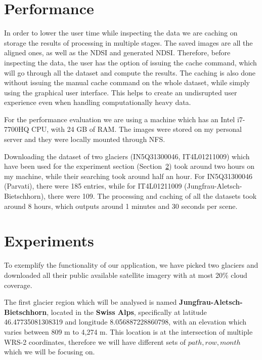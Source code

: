 \documentclass[12pt, a4paper]{report}
\begin{document}
	
	\section{Performance}
	\label{seq:performance}
	
	\par In order to lower the user time while inspecting the data we are caching on storage the results of processing in multiple stages. The saved images are all the aligned ones, as well as the NDSI and generated NDSI. Therefore, before inspecting the data, the user has the option of issuing the cache command, which will go through all the dataset and compute the results. The caching is also done without issuing the manual cache command on the whole dataset, while simply using the graphical user interface. This helps to create an undisrupted user experience even when handling computationally heavy data.
	
	For the performance evaluation we are using a machine which has an Intel i7-7700HQ CPU, with 24 GB of RAM. The images were stored on my personal server and they were locally mounted through NFS.
	
	Downloading the dataset of two glaciers (IN5Q31300046, IT4L01211009) which have been used for the experiment section (Section~\ref{seq:experiments}) took around two hours on my machine, while their searching took around half an hour. For IN5Q31300046 (Parvati), there were 185 entries, while for IT4L01211009 (Jungfrau-Aletsch-Bietschhorn), there were 109. The processing and caching of all the datasets took around 8 hours, which outputs around 1 minutes and 30 seconds per scene.
	
	\section{Experiments}
	\label{seq:experiments}
	
	\par To exemplify the functionality of our application, we have picked two glaciers and downloaded all their public available satellite imagery with at most 20\% cloud coverage. 
	
	\par The first glacier region which will be analysed is named \textbf{Jungfrau-Aletsch-Bietschhorn}, located in the \textbf{Swiss Alps}, specifically at latitude 46.47735081308319 and longitude 8.056887228860798, with an elevation which varies between 809 m to 4,274 m. This location is at the intersection of multiple WRS-2 coordinates, therefore we will have different sets of \(path, row, month\) which we will be focusing on.
	
\end{document}

